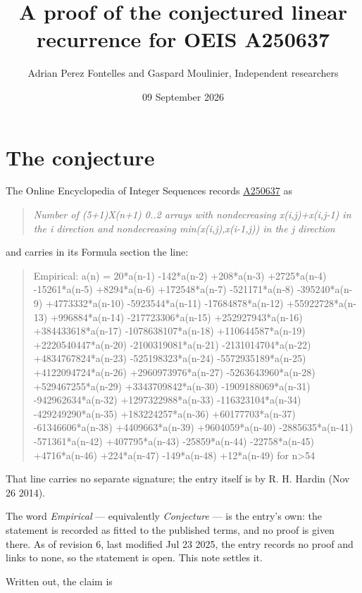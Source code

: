 \documentclass[11pt]{article}
\title{A proof of the conjectured linear recurrence for OEIS A250637}
\author{Adrian Perez Fontelles and Gaspard Moulinier, Independent researchers}
\date{09 September 2026}
\theoremstyle{definition}
\begin{document}
\maketitle
\section{The conjecture}

The Online Encyclopedia of Integer Sequences records \href{https://oeis.org/A250637}{A250637} as

\begin{quote}\itshape Number of (5+1)X(n+1) 0..2 arrays with nondecreasing x(i,j)+x(i,j-1) in the i direction and nondecreasing min(x(i,j),x(i-1,j)) in the j direction\end{quote}

and carries in its Formula section the line:

\begin{quote}\ttfamily Empirical: a(n) = 20*a(n-1) -142*a(n-2) +208*a(n-3) +2725*a(n-4) -15261*a(n-5) +8294*a(n-6) +172548*a(n-7) -521171*a(n-8) -395240*a(n-9) +4773332*a(n-10) -5923544*a(n-11) -17684878*a(n-12) +55922728*a(n-13) +996884*a(n-14) -217723306*a(n-15) +252927943*a(n-16) +384433618*a(n-17) -1078638107*a(n-18) +110644587*a(n-19) +2220540447*a(n-20) -2100319081*a(n-21) -2131014704*a(n-22) +4834767824*a(n-23) -525198323*a(n-24) -5572935189*a(n-25) +4122094724*a(n-26) +2960973976*a(n-27) -5263643960*a(n-28) +529467255*a(n-29) +3343709842*a(n-30) -1909188069*a(n-31) -942962634*a(n-32) +1297322988*a(n-33) -116323104*a(n-34) -429249290*a(n-35) +183224257*a(n-36) +60177703*a(n-37) -61346606*a(n-38) +4409663*a(n-39) +9604059*a(n-40) -2885635*a(n-41) -571361*a(n-42) +407795*a(n-43) -25859*a(n-44) -22758*a(n-45) +4716*a(n-46) +224*a(n-47) -149*a(n-48) +12*a(n-49) for n>54\end{quote}

That line carries no separate signature; the entry itself is by R. H. Hardin (Nov 26 2014).

The word {\itshape Empirical} --- equivalently {\itshape Conjecture} --- is the entry's own: the statement is recorded as fitted to the published terms, and no proof is given there. As of revision 6, last modified Jul 23 2025, the entry records no proof and links to none, so the statement is open. This note settles it.

Written out, the claim is
\end{document}
